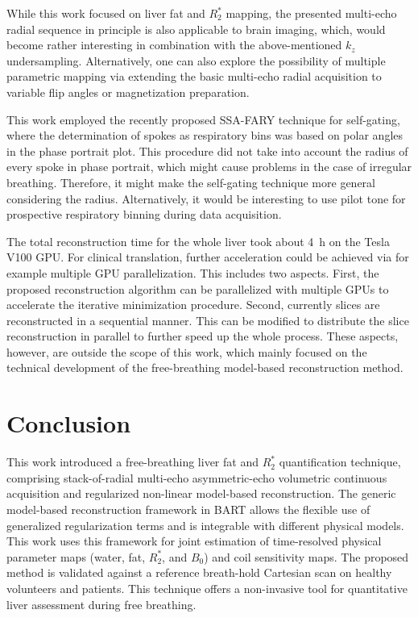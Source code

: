 \documentclass[journal,twoside,web]{ieeecolor}
\begin{document}
While this work focused on liver fat and $R_2^*$ mapping, 
the presented multi-echo radial sequence in principle 
is also applicable to brain imaging, which, 
would become rather interesting in combination with 
the above-mentioned $k_z$ undersampling. 
Alternatively, one can also explore the possibility of 
multiple parametric mapping 
via extending the basic multi-echo radial acquisition to 
variable flip angles or magnetization preparation.

This work employed the recently proposed SSA-FARY technique 
for self-gating, where the determination of spokes as respiratory bins 
was based on polar angles in the phase portrait plot. 
This procedure did not take into account the radius of every spoke 
in phase portrait, which might cause problems in the case of irregular breathing. 
Therefore, it might make the self-gating technique more general considering the radius. Alternatively, it would be interesting to use 
pilot tone \cite{solomon_2021_pilot_tone} for prospective respiratory binning 
during data acquisition. 

The total reconstruction time for the whole liver took about \SI{4}{\hour} 
on the Tesla V100 GPU. For clinical translation, 
further acceleration could be achieved via 
for example multiple GPU parallelization. 
This includes two aspects. 
First, the proposed reconstruction algorithm 
can be parallelized with multiple GPUs 
to accelerate the iterative minimization procedure.
Second, currently slices are reconstructed in a sequential manner. 
This can be modified to distribute the slice reconstruction in parallel 
to further speed up the whole process.
These aspects, however, are outside the scope of this work, 
which mainly focused on the technical development 
of the free-breathing model-based reconstruction method.



\section{Conclusion}

This work introduced a free-breathing liver fat and $R_2^*$ quantification 
technique, comprising stack-of-radial multi-echo asymmetric-echo volumetric continuous acquisition 
and regularized non-linear model-based reconstruction. 
The generic model-based reconstruction framework in BART allows the flexible
use of generalized regularization terms and is integrable with different 
physical models. This work uses this framework for joint estimation of
time-resolved physical parameter maps (water, fat, $R_2^*$, and $B_0$) 
and coil sensitivity maps.
The proposed method is validated against a reference breath-hold Cartesian scan 
on healthy volunteers and patients.
This technique offers a non-invasive tool for quantitative liver assessment
during free breathing.
\end{document}
